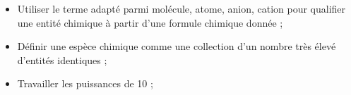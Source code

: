 \begin{tcolorbox}[colback=blue!5!white,colframe=blue!75!black,title=Objectifs :]
\begin{itemize}
    \item Utiliser le terme adapté parmi molécule, atome, anion, cation pour qualifier une entité chimique à partir d'une formule chimique donnée ;
    \item Définir une espèce chimique comme une collection d'un nombre très élevé d'entités identiques ;
    \item Travailler les puissances de 10 ;
\end{itemize}
\end{tcolorbox}

   

